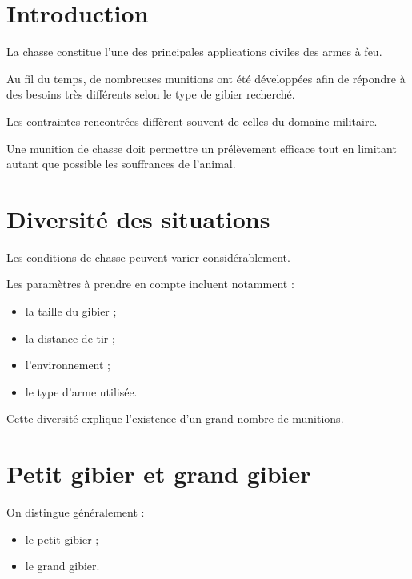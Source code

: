 
\section{Introduction}

La chasse constitue l'une des principales applications civiles des armes à feu.

Au fil du temps, de nombreuses munitions ont été développées afin de répondre
à des besoins très différents selon le type de gibier recherché.

Les contraintes rencontrées diffèrent souvent de celles du domaine militaire.

\begin{aretenir}

Une munition de chasse doit permettre un prélèvement efficace tout en limitant
autant que possible les souffrances de l'animal.

\end{aretenir}

\section{Diversité des situations}

Les conditions de chasse peuvent varier considérablement.

Les paramètres à prendre en compte incluent notamment :

\begin{itemize}
    \item la taille du gibier ;
    \item la distance de tir ;
    \item l'environnement ;
    \item le type d'arme utilisée.
\end{itemize}

Cette diversité explique l'existence d'un grand nombre de munitions.

\section{Petit gibier et grand gibier}

On distingue généralement :

\begin{itemize}
    \item le petit gibier ;
    \item le grand gibier.
\end{itemize}

